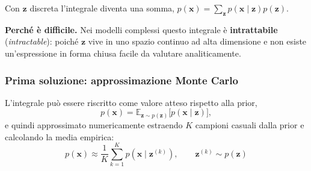 \documentclass[11pt,a4paper]{article}
\begin{document}
Con $\mathbf{z}$ discreta l'integrale diventa una somma,
$p(\mathbf{x})=\sum_{\mathbf{z}}p(\mathbf{x}\mid\mathbf{z})p(\mathbf{z})$.

\noindent\textbf{Perché è difficile.} Nei modelli complessi questo integrale è 
\textbf{intrattabile} (\emph{intractable}): poiché $\mathbf{z}$ vive 
in uno spazio continuo ad alta dimensione e non esiste un'espressione in forma chiusa 
facile da valutare analiticamente.

\subsubsection{Prima soluzione: approssimazione Monte Carlo}

L'integrale può essere riscritto come valore atteso rispetto alla prior,
\[
    p(\mathbf{x}) = \mathbb{E}_{\mathbf{z}\sim p(\mathbf{z})}\bigl[p(\mathbf{x} \mid \mathbf{z})\bigr],
\]
e quindi approssimato numericamente estraendo $K$ campioni casuali dalla prior e calcolando la media empirica:
\[
    p(\mathbf{x}) \approx \frac{1}{K}\sum_{k=1}^{K} p(\mathbf{x} \mid \mathbf{z}^{(k)}),
    \qquad \mathbf{z}^{(k)} \sim p(\mathbf{z})
\]
\end{document}
